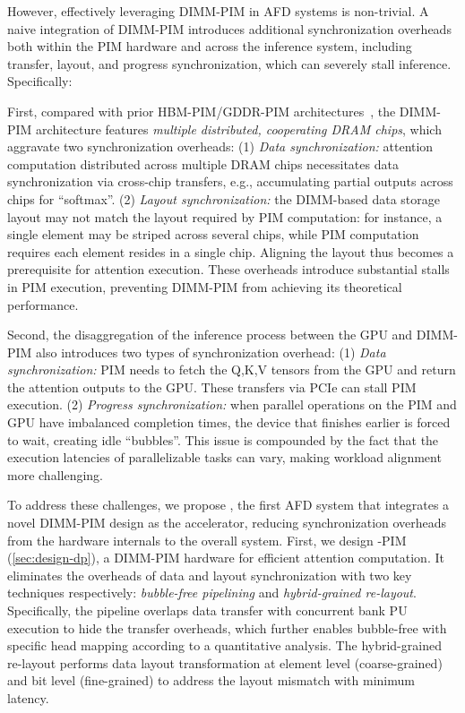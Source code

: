 However, effectively leveraging DIMM-PIM in AFD systems is non-trivial. 
A naive integration of DIMM-PIM introduces additional synchronization overheads both within the PIM hardware and across the inference system, including transfer, layout, and progress synchronization, which can severely stall inference.
Specifically: 

First, compared with prior HBM-PIM/GDDR-PIM architectures~\cite{he2025papi,heo2024neupims,park2024attacc,gu2025cent}, 
the DIMM-PIM architecture features \textit{multiple distributed, cooperating DRAM chips}, which aggravate two synchronization overheads:
(1) \textit{Data synchronization:} attention computation distributed across multiple DRAM chips necessitates data synchronization via cross-chip transfers, e.g., accumulating partial outputs across chips for ``softmax''.
(2) \textit{Layout synchronization:} the DIMM-based data storage layout may not match the layout required by PIM computation: 
for instance, a single element may be striped across several chips, while PIM computation requires each element resides in a single chip. 
Aligning the layout thus becomes a prerequisite for attention execution.
These overheads introduce substantial stalls in PIM execution, preventing DIMM-PIM from achieving its theoretical performance.




Second, the disaggregation of the inference process between the GPU and DIMM-PIM also introduces two types of synchronization overhead:
(1) \textit{Data synchronization:} PIM needs to fetch the Q,K,V tensors from the GPU and return the attention outputs to the GPU. 
These transfers via PCIe can stall PIM execution.
(2) \textit{Progress synchronization:} when parallel operations on the PIM and GPU have imbalanced completion times, the device that finishes earlier is forced to wait, creating idle ``bubbles''.
This issue is compounded by the fact that the execution latencies of parallelizable tasks can vary, making workload alignment more challenging.





To address these challenges, 
we propose \sys, the first AFD system that integrates a novel DIMM-PIM design as the accelerator, 
reducing synchronization overheads from the hardware internals to the overall system.
First, we design \sys-PIM (\textsection\ref{sec:design-dp}), a DIMM-PIM hardware for efficient attention computation.
It eliminates the overheads of data and layout synchronization with two key techniques respectively: \emph{bubble-free pipelining} and \emph{hybrid-grained re-layout}.
Specifically, the pipeline overlaps data transfer with concurrent bank PU execution to hide the transfer overheads, 
which further enables bubble-free with specific head mapping according to a quantitative analysis.
The hybrid-grained re-layout performs data layout transformation at element level (coarse-grained) and bit level (fine-grained) to address the layout mismatch with minimum latency.


